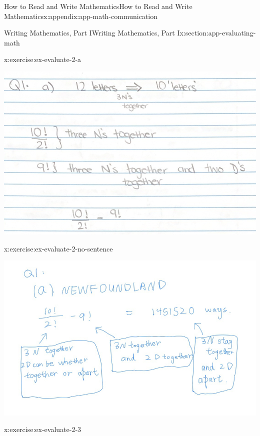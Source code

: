 \documentclass[oneside,10pt,]{book}
\numberwithin{equation}{section}
\begin{document}
\begin{appendixptx}{How to Read and Write Mathematics}{}{How to Read and Write Mathematics}{}{}{x:appendix:app-math-communication}
\begin{sectionptx}{Writing Mathematics, Part I}{}{Writing Mathematics, Part I}{}{}{x:section:app-evaluating-math}
\begin{inlineexercise}{}{x:exercise:ex-evaluate-2-a}
\begin{sidebyside}{1}{0}{0}{0}
\begin{sbspanel}{1}%
\includegraphics[width=\linewidth]{images/Sept23-newfoundland-1.png}
\end{sbspanel}%
\end{sidebyside}%
\end{inlineexercise}%
\begin{inlineexercise}{}{x:exercise:ex-evaluate-2-no-sentence}%
\begin{sidebyside}{1}{0}{0}{0}%
\begin{sbspanel}{1}%
\includegraphics[width=\linewidth]{images/Sept23-newfoundland-no-sentence.png}
\end{sbspanel}%
\end{sidebyside}%
\end{inlineexercise}%
\begin{inlineexercise}{}{x:exercise:ex-evaluate-2-3}%
\begin{sidebyside}{1}{0}{0}{0}%
\begin{sbspanel}{1}%

\end{sbspanel}
\end{sidebyside}
\end{inlineexercise}
\end{sectionptx}
\end{appendixptx}
\end{document}

